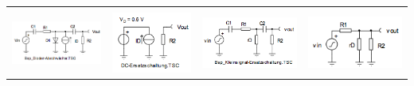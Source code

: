 \begin{tabular}{|p{4.3cm}|p{3.93cm}|p{4.5cm}|p{4.5cm}|}
			& 
			\\
			\parbox[c][3cm]{4.25cm}{\includegraphics[width=4.25cm]{./images/dc-kleinsignal-ersatz-beispiel.png}}
			& \parbox[c][3cm]{3.8cm}{\includegraphics[width=3.8cm]{./images/dc-kleinsignal-ersatz-dc.png}}
			& \parbox[c][3cm]{4.5cm}{\includegraphics[width=4.5cm]{./images/dc-kleinsignal-ersatz-LC.png}}
			& \parbox[c][3cm]{4.5cm}{\includegraphics[width=4.5cm]{./images/dc-kleinsignal-ersatz-ohneLC.png}}
			\\ \hline
			\end{tabular}
			

